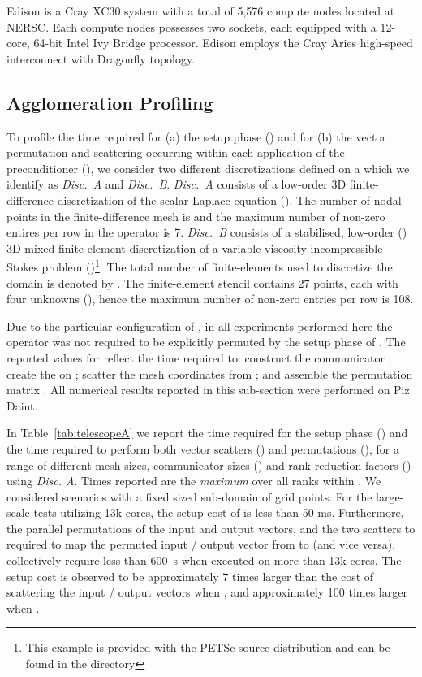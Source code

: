 \documentclass[]{siamart0216}
\begin{document}
Edison is a Cray XC30 system with a total of 5,576 compute nodes located at NERSC. 
Each compute nodes possesses two sockets, each equipped with a 12-core, 
64-bit Intel Ivy Bridge processor. 
Edison employs the Cray Aries high-speed interconnect with Dragonfly topology. 

\subsection{Agglomeration Profiling}




To profile the time required for (a) the setup phase () and 
for (b) the vector permutation and scattering occurring within each application 
of the  preconditioner (), we consider two different discretizations defined on a  which we identify 
as \emph{Disc.~A} and \emph{Disc.~B}. 
\emph{Disc.~A} consists of a low-order 3D finite-difference discretization of the scalar Laplace equation ().
The number of nodal points in the finite-difference mesh is  and
the maximum number of non-zero entires per row in the operator is 7.
\emph{Disc.~B} consists of a stabilised, low-order () 3D mixed finite-element discretization of a variable 
viscosity incompressible Stokes problem ()\footnote{This example is provided with the PETSc source distribution and can be found  in the directory }. 
The total number of finite-elements used to discretize the domain is denoted by . 
The  finite-element stencil contains 27 points, each with four unknowns (), 
hence the maximum number of non-zero entries per row is 108.

Due to the particular configuration of , in all experiments performed here the 
operator  was not required to be explicitly permuted by the setup phase of .
The reported values for  reflect the time required to: construct the communicator ;
create the  on ; scatter the mesh coordinates from ; and 
assemble the permutation matrix .
All numerical results reported in this sub-section were performed on Piz Daint.




In Table~\ref{tab:telescopeA} we report the time required for the setup phase () and the time required to perform both 
vector scatters () and permutations (), for a range of 
different mesh sizes, communicator sizes () and rank reduction factors () using \emph{Disc. A}.
Times reported are the \textit{maximum} over all ranks within .
We considered scenarios with a fixed sized sub-domain of  grid points. 
For the large-scale tests utilizing 13k cores, the setup cost of  is less than 50 ms.
Furthermore, the parallel permutations of the input and output vectors, and the 
two scatters to required to map the permuted input / output vector from  to  (and vice versa), 
collectively require less than 600~s when executed on more than 13k cores.
The setup cost is observed to be approximately 7 times larger than the cost of scattering the input / output vectors 
when , and approximately 100 times larger when .
\end{document}
